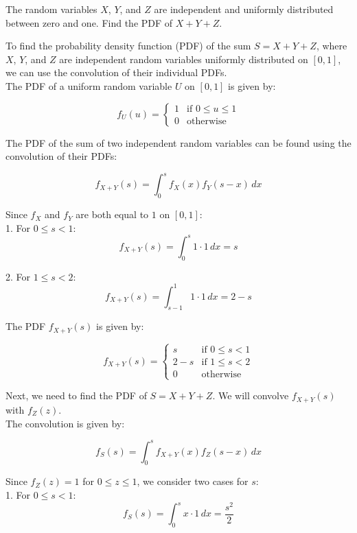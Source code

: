 \begin{exercise}
The random variables \(X\), \(Y\), and \(Z\) are independent and uniformly distributed between zero and one. Find the PDF of \(X + Y + Z\).
\end{exercise}

\begin{solution}
To find the probability density function (PDF) of the sum \(S = X + Y + Z\), where \(X\), \(Y\), and \(Z\) are independent random variables uniformly distributed on \([0, 1]\), we can use the convolution of their individual PDFs.\\

The PDF of a uniform random variable \(U\) on \([0, 1]\) is given by:

\[
f_U(u) = 
\begin{cases} 
1 & \text{if } 0 \leq u \leq 1 \\ 
0 & \text{otherwise} 
\end{cases}
\]

The PDF of the sum of two independent random variables can be found using the convolution of their PDFs:

\[
f_{X+Y}(s) = \int_{0}^{s} f_X(x) f_Y(s - x) \, dx
\]

Since \(f_X\) and \(f_Y\) are both equal to \(1\) on \([0, 1]\):\\

1. For \(0 \leq s < 1\):
\[
f_{X+Y}(s) = \int_{0}^{s} 1 \cdot 1 \, dx = s
\]

2. For \(1 \leq s < 2\):
\[
f_{X+Y}(s) = \int_{s-1}^{1} 1 \cdot 1 \, dx = 2 - s
\]

The PDF \(f_{X+Y}(s)\) is given by:

\[
f_{X+Y}(s) = 
\begin{cases} 
s & \text{if } 0 \leq s < 1 \\ 
2 - s & \text{if } 1 \leq s < 2 \\ 
0 & \text{otherwise} 
\end{cases}
\]

Next, we need to find the PDF of \(S = X + Y + Z\). We will convolve \(f_{X+Y}(s)\) with \(f_Z(z)\).\\

The convolution is given by:

\[
f_{S}(s) = \int_{0}^{s} f_{X+Y}(x) f_Z(s - x) \, dx
\]

Since \(f_Z(z) = 1\) for \(0 \leq z \leq 1\), we consider two cases for \(s\):\\

1. For \(0 \leq s < 1\):
\[
f_S(s) = \int_{0}^{s} x \cdot 1 \, dx = \frac{s^2}{2}
\]


\end{solution}
